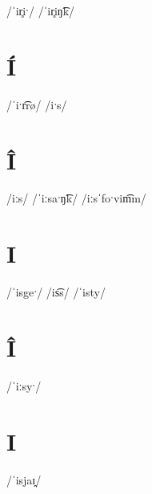 \documentclass[10pt,a4paper,twoside]{book}
\begin{document}
\begin{multicols}{3}
 {/ˈir̥iˑ/} {}
 {/ˈir̥iŋ͡k/} {}
\end{multicols}

\section*{Í}

\begin{multicols}{3}
 {/ˈiˑr͡rø/} {}
 {/iˑs/} {}
\end{multicols}

\section*{Î}

\begin{multicols}{3}
 {/iːs/} {}
 {/ˈiːsaˑŋ͡k/} {}
 {/iːsˈfoˑvim͡m/} {}
\end{multicols}

\section*{I}

\begin{multicols}{3}
 {/ˈisgeˑ/} {}
 {/is͡s/} {}
 {/ˈisty/} {}
\end{multicols}

\section*{Î}

\begin{multicols}{3}
 {/ˈiːsyˑ/} {}
\end{multicols}

\section*{I}

\begin{multicols}{3}
 {/ˈisjaɪ̯/} {}
\end{multicols}
\end{document}
